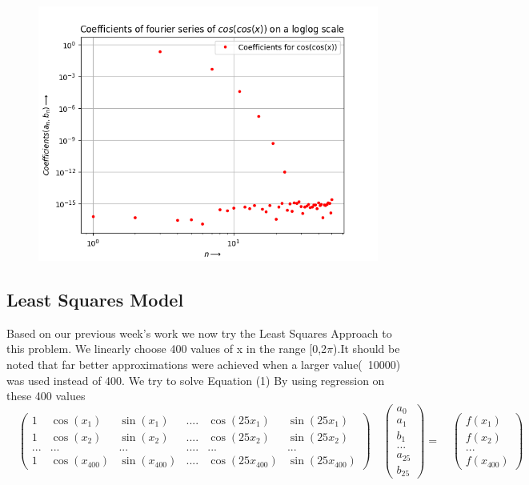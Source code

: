 \documentclass{article}
\begin{document}
\begin{figure}[h!]
    \centering
    \includegraphics[scale=0.7]{coscoscoeff1.png}
    \label{fig:1(b)}
\end{figure}
\clearpage
\subsection{Least Squares Model}
Based on our previous week's work we now try the Least Squares Approach to this problem. We linearly choose 400 values of x in the range [0,2$\pi$).It should be noted that far better approximations were achieved when a larger value(~10000) was used instead of 400. 
We try to solve Equation (1) By using regression on these 400 values 
\[
\quad
\begin{pmatrix} 
1 & \cos(x_1) & \sin(x_1) & .... & \cos(25x_1) & \sin(25x_1)\\
1 & \cos(x_2) & \sin(x_2) & .... & \cos(25x_2) & \sin(25x_2)\\
... & ... & ... & .... & ... & ... \\
1 & \cos(x_{400}) & \sin(x_{400}) & .... & \cos(25x_{400}) & \sin(25x_{400})
\end{pmatrix}
\quad
\begin{pmatrix} 
a_0\\
a_1\\
b_1\\
...\\
a_{25}\\
b_{25}
\end{pmatrix}
=
\quad
\begin{pmatrix} 
f(x_1)\\
f(x_2)\\
...\\
f(x_{400})
\end{pmatrix}
\]
\end{document}
